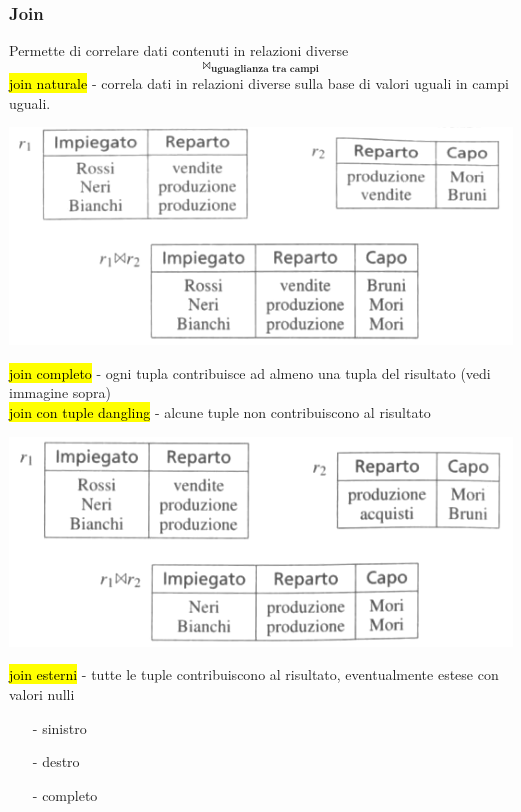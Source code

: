 \documentclass[a4paper]{article}
\begin{document}
\subsubsection{Join}
Permette di correlare dati contenuti in relazioni diverse
\[\Join_{\textbf{uguaglianza tra campi}}\]
%
\hl{join naturale} - correla dati in relazioni diverse sulla base di valori uguali in campi uguali.
\begin{center}
      \includegraphics[scale=0.45]{img/ar6.png}
\end{center}
%
\hl{join completo} - ogni tupla contribuisce ad almeno una tupla del risultato (vedi immagine sopra)\medskip\\
%
\hl{join con tuple dangling} - alcune tuple non contribuiscono al risultato
\begin{center}
      \includegraphics[scale=0.45]{img/ar7.png}
\end{center}
%
\hl{join esterni} - tutte le tuple contribuiscono al risultato, eventualmente estese con valori nulli
\begin{itemize}[noitemsep]
  \item [-] sinistro
  \item [-] destro
  \item [-] completo
\end{itemize}
\end{document}
